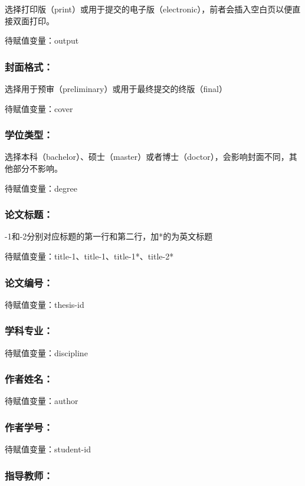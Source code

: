 选择打印版（print）或用于提交的电子版（electronic），前者会插入空白页以便直接双面打印。

待赋值变量：output

\subsubsection{封面格式：}

选择用于预审（preliminary）或用于最终提交的终版（final）

待赋值变量：cover

\subsubsection{学位类型：}

选择本科（bachelor）、硕士（master）或者博士（doctor），会影响封面不同，其他部分不影响。

待赋值变量：degree

\subsubsection{论文标题：}

-1和-2分别对应标题的第一行和第二行，加*的为英文标题

待赋值变量：title-1、title-1、title-1*、title-2*

\subsubsection{论文编号：}

待赋值变量：thesis-id

\subsubsection{学科专业：}

待赋值变量：discipline

\subsubsection{作者姓名：}

待赋值变量：author

\subsubsection{作者学号：}

待赋值变量：student-id

\subsubsection{指导教师：}


